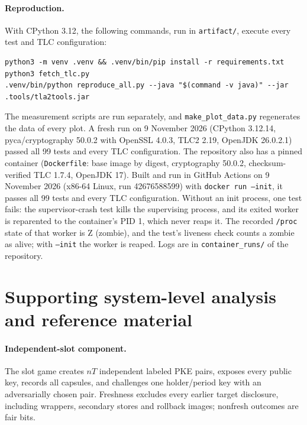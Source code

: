 \documentclass[pdflatex,sn-mathphys-num]{sn-jnl}
\newcommand{\code}[1]{\texttt{#1}}
\newcommand{\fpath}[1]{\nolinkurl{#1}}%
\theoremstyle{plain}
\begin{document}
\paragraph{Reproduction.}
With CPython 3.12, the following commands, run in \fpath{artifact/}, execute every test and TLC configuration:
\begin{Verbatim}[fontsize=\footnotesize]
python3 -m venv .venv && .venv/bin/pip install -r requirements.txt
python3 fetch_tlc.py
.venv/bin/python reproduce_all.py --java "$(command -v java)" --jar .tools/tla2tools.jar
\end{Verbatim}
The measurement scripts are run separately, and \code{make\_plot\_data.py} regenerates the data of every plot. A fresh run on 9 November 2026 (CPython 3.12.14, pyca/cryptography 50.0.2 with OpenSSL 4.0.3, TLC2 2.19, OpenJDK 26.0.2.1) passed all 99 tests and every TLC configuration. The repository also has a pinned container (\fpath{Dockerfile}: base image by digest, cryptography 50.0.2, checksum-verified TLC 1.7.4, OpenJDK 17). Built and run in GitHub Actions on 9 November 2026 (x86-64 Linux, run 42676588599) with \code{docker run --init}, it passes all 99 tests and every TLC configuration. Without an init process, one test fails: the supervisor-crash test kills the supervising process, and its exited worker is reparented to the container's PID 1, which never reaps it. The recorded \fpath{/proc} state of that worker is Z (zombie), and the test's liveness check counts a zombie as alive; with \code{--init} the worker is reaped. Logs are in \fpath{container_runs/} of the repository.

\section{Supporting system-level analysis and reference material}\label{sec:s-reference}

\paragraph{Independent-slot component.}
The slot game creates $nT$ independent labeled PKE pairs, exposes every public key, records all capsules, and challenges one holder/period key with an adversarially chosen pair. Freshness excludes every earlier target disclosure, including wrappers, secondary stores and rollback images; nonfresh outcomes are fair bits.
\end{document}

